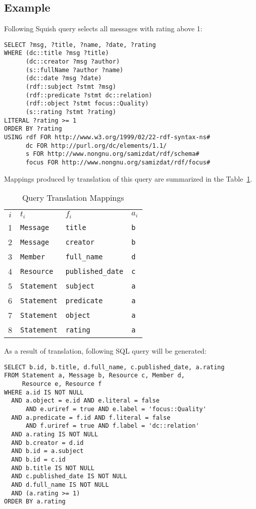 \documentclass{llncs}
\begin{document}
\subsection{Example}

Following Squish query selects all messages with rating above 1:

\begin{verbatim}
SELECT ?msg, ?title, ?name, ?date, ?rating
WHERE (dc::title ?msg ?title)
      (dc::creator ?msg ?author)
      (s::fullName ?author ?name)
      (dc::date ?msg ?date)
      (rdf::subject ?stmt ?msg)
      (rdf::predicate ?stmt dc::relation)
      (rdf::object ?stmt focus::Quality)
      (s::rating ?stmt ?rating)
LITERAL ?rating >= 1
ORDER BY ?rating
USING rdf FOR http://www.w3.org/1999/02/22-rdf-syntax-ns#
      dc FOR http://purl.org/dc/elements/1.1/
      s FOR http://www.nongnu.org/samizdat/rdf/schema#
      focus FOR http://www.nongnu.org/samizdat/rdf/focus#
\end{verbatim}

Mappings produced by translation of this query are summarized in the
Table~\ref{mappings-table}.

\begin{table}
\caption{Query Translation Mappings}
\label{mappings-table}
\begin{center}
\begin{tabular}{clll}
\hline\noalign{\smallskip}
$i$ & $t_i$ & $f_i$ & $a_i$\\
\noalign{\smallskip}
\hline
\noalign{\smallskip}
1 & {\tt Message} & {\tt title} & {\tt b}\\
2 & {\tt Message} & {\tt creator} & {\tt b}\\
3 & {\tt Member} & {\tt full\_name} & {\tt d}\\
4 & {\tt Resource} & {\tt published\_date} & {\tt c}\\
5 & {\tt Statement} & {\tt subject} & {\tt a}\\
6 & {\tt Statement} & {\tt predicate} & {\tt a}\\
7 & {\tt Statement} & {\tt object} & {\tt a}\\
8 & {\tt Statement} & {\tt rating} & {\tt a}\\
\hline
\end{tabular}
\end{center}
\end{table}

As a result of translation, following SQL query will be generated:

\begin{verbatim}
SELECT b.id, b.title, d.full_name, c.published_date, a.rating
FROM Statement a, Message b, Resource c, Member d,
     Resource e, Resource f
WHERE a.id IS NOT NULL
  AND a.object = e.id AND e.literal = false
      AND e.uriref = true AND e.label = 'focus::Quality'
  AND a.predicate = f.id AND f.literal = false
      AND f.uriref = true AND f.label = 'dc::relation'
  AND a.rating IS NOT NULL
  AND b.creator = d.id
  AND b.id = a.subject
  AND b.id = c.id
  AND b.title IS NOT NULL
  AND c.published_date IS NOT NULL
  AND d.full_name IS NOT NULL
  AND (a.rating >= 1)
ORDER BY a.rating
\end{verbatim}
\end{document}
